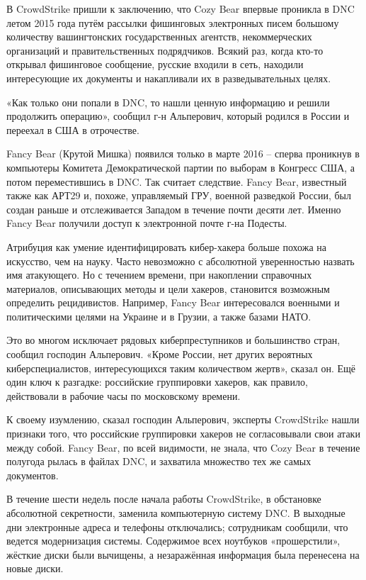 В CrowdStrike пришли к заключению, что Cozy Bear впервые проникла в DNC
летом 2015 года путём рассылки фишинговых электронных писем большому
количеству вашингтонских государственных агентств, некоммерческих
организаций и правительственных подрядчиков. Всякий раз, когда кто-то
открывал фишинговое сообщение, русские входили в сеть, находили
интересующие их документы и накапливали их в разведывательных целях.

«Как только они попали в DNC, то нашли ценную информацию и решили
продолжить операцию», сообщил г-н Альперович, который родился в России и
переехал в США в отрочестве.

Fancy Bear (Крутой Мишка) появился только в марте 2016 -- сперва
проникнув в компьютеры Комитета Демократической партии по выборам в
Конгресс США, а потом переместившись в DNC. Так считает следствие. Fancy
Bear, известный также как АРТ29 и, похоже, управляемый ГРУ, военной
разведкой России, был создан раньше и отслеживается Западом в течение
почти десяти лет. Именно Fancy Bear получили доступ к электронной почте
г-на Подесты.

Атрибуция как умение идентифицировать кибер-хакера больше похожа на
искусство, чем на науку. Часто невозможно с абсолютной уверенностью
назвать имя атакующего. Но с течением времени, при накоплении справочных
материалов, описывающих методы и цели хакеров, становится возможным
определить рецидивистов. Например, Fancy Bear интересовался военными и
политическими целями на Украине и в Грузии, а также базами НАТО.

Это во многом исключает рядовых киберпреступников и большинство стран,
сообщил господин Альперович. «Кроме России, нет других вероятных
киберспециалистов, интересующихся таким количеством жертв», сказал он.
Ещё один ключ к разгадке: российские группировки хакеров, как правило,
действовали в рабочие часы по московскому времени.

К своему изумлению, сказал господин Альперович, эксперты CrowdStrike
нашли признаки того, что российские группировки хакеров не согласовывали
свои атаки между собой. Fancy Bear, по всей видимости, не знала, что
Cozy Bear в течение полугода рылась в файлах DNC, и захватила множество
тех же самых документов.

В течение шести недель после начала работы CrowdStrike, в обстановке
абсолютной секретности, заменила компьютерную систему DNC. В выходные
дни электронные адреса и телефоны отключались; сотрудникам сообщили, что
ведется модернизация системы. Содержимое всех ноутбуков «прошерстили»,
жёсткие диски были вычищены, а незаражённая информация была перенесена
на новые диски.

